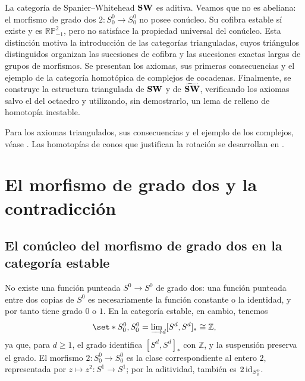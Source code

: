 La categoría de Spanier--Whitehead $\mathbf{SW}$ es aditiva. Veamos que no es abeliana: el morfismo de grado dos $2\colon S^0_0\to S^0_0$ no posee conúcleo. Su cofibra estable sí existe y es $\mathbb{RP}^2_{-1}$, pero no satisface la propiedad universal del conúcleo. Esta distinción motiva la introducción de las categorías trianguladas, cuyos triángulos distinguidos organizan las sucesiones de cofibra y las sucesiones exactas largas de grupos de morfismos. Se presentan los axiomas, sus primeras consecuencias y el ejemplo de la categoría homotópica de complejos de cocadenas. Finalmente, se construye la estructura triangulada de $\mathbf{SW}$ y de $\widetilde{\mathbf{SW}}$, verificando los axiomas salvo el del octaedro y utilizando, sin demostrarlo, un lema de relleno de homotopía inestable.

Para los axiomas triangulados, sus consecuencias y el ejemplo de los complejos, véase \cite[\S5, especialmente ejemplo~5.12 y proposición~5.16]{schwede2026}. Las homotopías de conos que justifican la rotación se desarrollan en \cite[cap.~8, \S4, pp.~59--60]{may1999}.

\section{El morfismo de grado dos y la contradicción}

\subsection{El conúcleo del morfismo de grado dos en la categoría estable}

No existe una función punteada $S^0\to S^0$ de grado dos: una función punteada entre dos copias de $S^0$ es necesariamente la función constante o la identidad, y por tanto tiene grado $0$ o $1$. En la categoría estable, en cambio, tenemos
\[
\set*{S^0_0,S^0_0}=\varinjlim\nolimits_d[S^d,S^d]_*\cong\mathbb Z,
\]
ya que, para $d\geq1$, el grado identifica $[S^d,S^d]_*$ con $\mathbb Z$, y la suspensión preserva el grado. El morfismo $2\colon S^0_0\to S^0_0$ es la clase correspondiente al entero $2$, representada por $z\mapsto z^2\colon S^1\to S^1$; por la aditividad, también es $2\operatorname{id}_{S^0_0}$.

